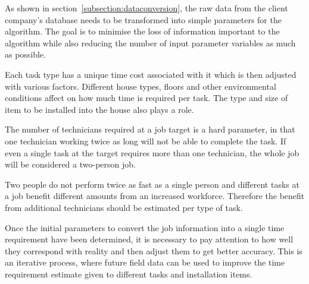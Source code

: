 As shown in section~\ref{subsection:dataconversion}, the raw data from the client company's database needs to be transformed into simple parameters for the algorithm. The goal is to minimise the loss of information important to the algorithm while also reducing the number of input parameter variables as much as possible.  

Each task type has a unique time cost associated with it which is then adjusted with various factors. Different house types, floors and other environmental conditions affect on how much time is required per task. The type and size of item to be installed into the house also plays a role. 

The number of technicians required at a job target is a hard parameter, in that one technician working twice as long will not be able to complete the task. If even a single task at the target requires more than one technician, the whole job will be considered a two-person job. 

Two people do not perform twice as fast as a single person and different tasks at a job benefit different amounts from an increased workforce. Therefore the benefit from additional technicians should be estimated per type of task. 

Once the initial parameters to convert the job information into a single time requirement have been determined, it is necessary to pay attention to how well they correspond with reality and then adjust them to get better accuracy. This is an iterative process, where future field data can be used to improve the time requirement estimate given to different tasks and installation items. 




